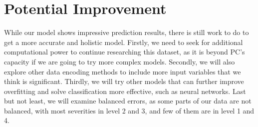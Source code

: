 \documentclass[twocolumn]{article}
\begin{document}
\section{Potential Improvement}
While our model shows impressive prediction results, there is still work to do to get a more accurate and holistic model. Firstly, we need to seek for additional computational power to continue researching this dataset, as it is beyond PC's capacity if we are going to try more complex models. Secondly, we will also explore other data encoding methods to include more input variables that we think is significant. Thirdly, we will try other models that can further improve overfitting and solve classification more effective, such as neural networks. Last but not least, we will examine balanced errors, as some parts of our data are not balanced, with most severities in level 2 and 3, and few of them are in level 1 and 4. 
\end{document}
